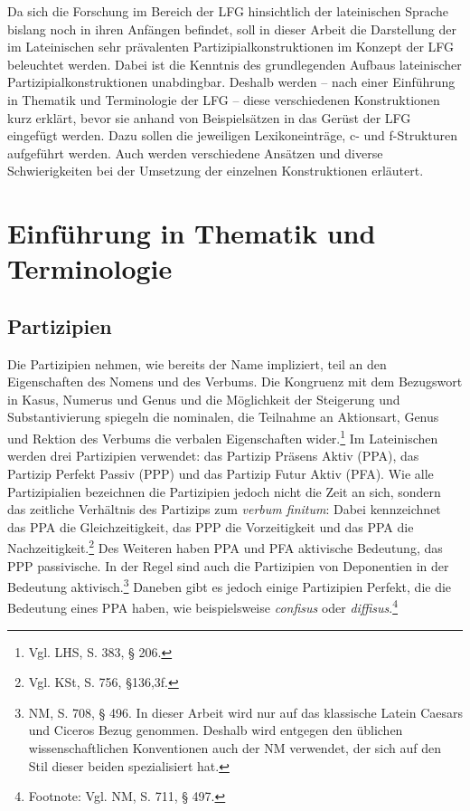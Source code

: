\documentclass[12pt,a4paper]{article}
\begin{document}
Da sich die Forschung im Bereich der LFG hinsichtlich der lateinischen Sprache bislang noch in ihren Anfängen befindet, soll in dieser Arbeit die Darstellung der im Lateinischen sehr prävalenten Partizipialkonstruktionen im Konzept der LFG beleuchtet werden. Dabei ist die Kenntnis des grundlegenden Aufbaus lateinischer Partizipialkonstruktionen unabdingbar. Deshalb werden -- nach einer Einführung in Thematik und Terminologie der LFG -- diese verschiedenen Konstruktionen kurz erklärt, bevor sie anhand von Beispielsätzen in das Gerüst der LFG eingefügt werden. Dazu sollen die jeweiligen Lexikoneinträge, c- und f-Strukturen aufgeführt werden. Auch werden verschiedene Ansätzen und diverse Schwierigkeiten bei der Umsetzung der einzelnen Konstruktionen erläutert. 

\section{Einführung in Thematik und Terminologie}
\subsection{Partizipien}
Die Partizipien nehmen, wie bereits der Name impliziert, teil an den Eigenschaften des Nomens und des Verbums. Die Kongruenz mit dem Bezugswort in Kasus, Numerus und Genus und die Möglichkeit der Steigerung und Substantivierung spiegeln die nominalen, die Teilnahme an Aktionsart, Genus und Rektion des Verbums die verbalen Eigenschaften wider.\footnote{Vgl. LHS, S. 383, § 206.}
Im Lateinischen werden drei Partizipien verwendet: das Partizip Präsens Aktiv (PPA), das Partizip Perfekt Passiv (PPP) und das Partizip Futur Aktiv (PFA).
Wie alle Partizipialien bezeichnen die Partizipien jedoch nicht die Zeit an sich, sondern das zeitliche Verhältnis des Partizips zum \textit{verbum finitum}: Dabei kennzeichnet das PPA die Gleichzeitigkeit, das PPP die Vorzeitigkeit und das PPA die Nachzeitigkeit.\footnote{Vgl. KSt, S. 756, §136,3f.}
Des Weiteren haben PPA und PFA aktivische Bedeutung, das PPP passivische. In der Regel sind auch die Partizipien von Deponentien in der Bedeutung aktivisch.\footnote{NM, S. 708, § 496. In dieser Arbeit wird nur auf das klassische Latein Caesars und Ciceros Bezug genommen. Deshalb wird entgegen den üblichen wissenschaftlichen Konventionen auch der NM verwendet, der sich auf den Stil dieser beiden spezialisiert hat.} Daneben gibt es jedoch einige Partizipien Perfekt, die die Bedeutung eines PPA haben, wie beispielsweise \textit{confisus} oder \textit{diffisus}.\footnote{Footnote: Vgl. NM, S. 711, § 497.}
\end{document}
